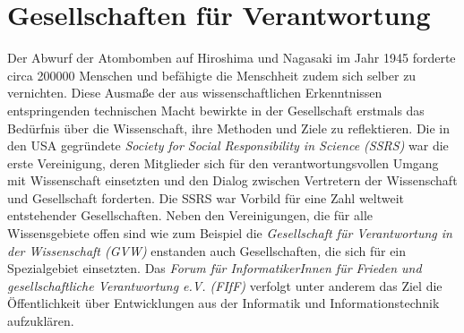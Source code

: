 \documentclass{pmwk}
\begin{document}
\section*{Gesellschaften für Verantwortung}
Der Abwurf der Atombomben auf Hiroshima und Nagasaki im Jahr 1945 forderte circa 200000 Menschen und befähigte die Menschheit zudem sich selber zu vernichten. Diese Ausmaße der aus wissenschaftlichen Erkenntnissen entspringenden technischen Macht bewirkte in der Gesellschaft erstmals das Bedürfnis über die Wissenschaft, ihre Methoden und Ziele zu reflektieren. Die in den USA gegründete \textit{Society for Social Responsibility in Science (SSRS)} war die erste Vereinigung, deren Mitglieder sich für den verantwortungsvollen Umgang mit Wissenschaft einsetzten und den Dialog zwischen Vertretern der Wissenschaft und Gesellschaft forderten. Die SSRS war Vorbild für eine Zahl weltweit entstehender Gesellschaften. Neben den Vereinigungen, die für alle Wissensgebiete offen sind wie zum Beispiel die \textit{Gesellschaft für Verantwortung in der Wissenschaft (GVW)} enstanden auch Gesellschaften,  die sich für ein Spezialgebiet einsetzten. Das \textit{Forum für InformatikerInnen für Frieden und gesellschaftliche Verantwortung e.V. (FIfF)} verfolgt unter anderem das Ziel die Öffentlichkeit über Entwicklungen aus der Informatik und Informationstechnik aufzuklären.



\end{document}
